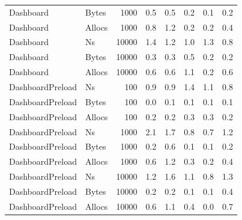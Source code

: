 \begin{table}[ht]
\begin{tabular}{llrrrrrr}
	Dashboard & Bytes & 1000 &  0.5 &  0.5 &  0.2 &  0.1 &  0.2 \\
	Dashboard & Allocs & 1000 &  0.8 &  1.2 &  0.2 &  0.2 &  0.4 \\
	Dashboard & Ns & 10000 &  1.4 &  1.2 &  1.0 &  1.3 &  0.8 \\
	Dashboard & Bytes & 10000 &  0.3 &  0.3 &  0.5 &  0.2 &  0.2 \\
	Dashboard & Allocs & 10000 &  0.6 &  0.6 &  1.1 &  0.2 &  0.6 \\
	DashboardPreload & Ns & 100 &  0.9 &  0.9 &  1.4 &  1.1 &  0.8 \\
	DashboardPreload & Bytes & 100 &  0.0 &  0.1 &  0.1 &  0.1 &  0.1 \\
	DashboardPreload & Allocs & 100 &  0.2 &  0.2 &  0.3 &  0.3 &  0.2 \\
	DashboardPreload & Ns & 1000 & \cellcolor{red!11}  2.1 &  1.7 &  0.8 &  0.7 &  1.2 \\
	DashboardPreload & Bytes & 1000 &  0.2 &  0.6 &  0.1 &  0.1 &  0.2 \\
	DashboardPreload & Allocs & 1000 &  0.6 &  1.2 &  0.3 &  0.2 &  0.4 \\
	DashboardPreload & Ns & 10000 &  1.2 &  1.6 &  1.1 &  0.8 &  1.3 \\
	DashboardPreload & Bytes & 10000 &  0.2 &  0.2 &  0.1 &  0.1 &  0.4 \\
	DashboardPreload & Allocs & 10000 &  0.6 &  1.1 &  0.4 &  0.0 &  0.7 \\
\bottomrule
\end{tabular}
\label{tab:variationskoeffizienten_sql}
\end{table}
	